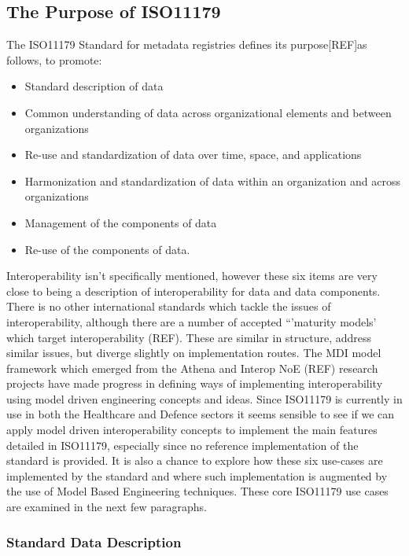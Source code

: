 \documentclass{llncs}
\begin{document}
\subsection{The Purpose of ISO11179}

The ISO11179 Standard for metadata registries defines its purpose[REF]as follows,
\newline
to promote:
\begin{itemize}
\item Standard description of data
\item Common understanding of data across organizational elements and between organizations
\item Re-use and standardization of data over time, space, and applications
\item Harmonization and standardization of data within an organization and across organizations
\item Management of the components of data
\item Re-use of the components of data.
\end{itemize}

Interoperability isn't specifically mentioned, however these six items are very close to being a description of interoperability for data and data components. There is no other international standards which tackle the issues of interoperability, although there are a number of accepted ``'maturity models' which target interoperability (REF). These are similar in structure, address similar issues, but diverge slightly on implementation routes. The MDI model framework which emerged from the Athena and Interop NoE (REF) research projects have made progress in defining ways of implementing interoperability using model driven engineering concepts and ideas. Since ISO11179 is currently in use in both the Healthcare and Defence sectors it seems sensible to see if we can apply model driven interoperability concepts to implement the main features detailed in ISO11179, especially since no reference implementation of the standard is provided. It is also a chance to explore how these six use-cases are implemented by the standard and where such implementation is augmented by the use of Model Based Engineering techniques. These core ISO11179 use cases are examined in the next few paragraphs.

 
\subsubsection{Standard Data Description}
\end{document}
